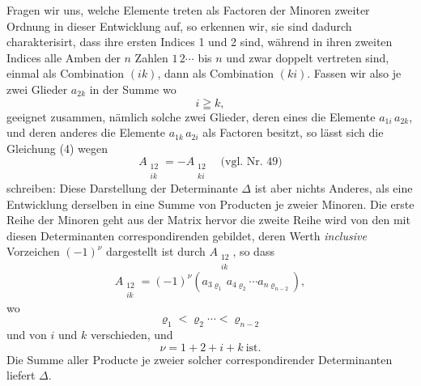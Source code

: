 Fragen wir uns, welche Elemente treten als Factoren der Minoren zweiter Ordnung in dieser Entwicklung auf, so erkennen wir, sie sind dadurch charakterisirt, dass ihre ersten Indices 1 und 2 sind, während in ihren zweiten Indices alle Amben der $n$ Zahlen $1\,2\cdots$ bis $n$ und zwar doppelt vertreten sind, einmal als Combination $(ik)$, dann als Combination $(ki)$. Fassen wir also je zwei Glieder $a_{2k}$ in der Summe
wo
\[
i \geqq k,
\]
geeignet zusammen, nämlich solche zwei Glieder, deren eines die Elemente $a_{1i}\, a_{2k}$, und deren anderes die Elemente $a_{1k}\, a_{2i}$ als Factoren besitzt, so lässt sich die Gleichung (4) wegen
\[
A_{\substack{12\\ik}} = - A_{\substack{12\\ki}} \quad \text{(vgl. Nr. 49)}
\]
schreiben:
Diese Darstellung der Determinante $\Delta$ ist aber nichts Anderes, als eine Entwicklung derselben in eine Summe von Producten je zweier Minoren. Die erste Reihe der Minoren geht aus der Matrix hervor
die zweite Reihe wird von den mit diesen Determinanten correspondirenden gebildet, deren Werth \textit{inclusive} Vorzeichen $(-1)^{\nu}$ dargestellt ist durch $A_{\substack{12\\ik}}$, so dass
\[
A_{\substack{12\\ik}} = (-1)^{\nu} (a_{3\varrho_1}\, a_{4\varrho_2} \cdots a_{n\varrho_{n-2}}),
\]
wo
\[
\varrho_1 < \varrho_2 \cdots < \varrho_{n-2}
\]
und von $i$ und $k$ verschieden,
und
\[
\nu = 1 + 2 + i + k \ \text{ist}.
\]
Die Summe aller Producte je zweier solcher correspondirender Determinanten liefert $\Delta$.


